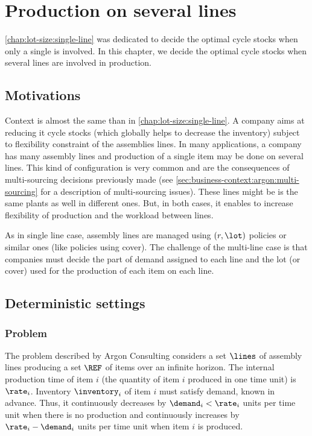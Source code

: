 \chapter{Production on several lines}
\label{chap:lot-size:several-lines}



\cref{chap:lot-size:single-line} was dedicated to decide the optimal cycle stocks when only a single is involved.
In this chapter, we decide the optimal cycle stocks when several lines are involved in production.



\section{Motivations}
\label{sec:lot-size:several-lines:motivations}


Context is almost the same than in \cref{chap:lot-size:single-line}.
A company aims at reducing it cycle stocks (which globally helps to decrease the inventory) subject to flexibility constraint of the assemblies lines.
In many applications, a company has many assembly lines and production of a single item may be done on several lines.
This kind of configuration is very common and are the consequences of multi-sourcing decisions previously made (see \cref{sec:business-context:argon:multi-sourcing} for a description of multi-sourcing issues).
These lines might be is the same plants as well in different ones.
But, in both cases, it enables to increase flexibility of production and the workload between lines.


As in single line case, assembly lines are managed using $(r,\lot)$ policies or similar ones (like policies using cover).
The challenge of the multi-line case is that companies must decide the part of demand assigned to each line and the lot (or cover) used for the production of each item on each line.


\section{Deterministic settings}


\subsection{Problem}


The problem described by Argon Consulting considers a set $\lines$ of assembly lines producing a set $\REF$ of items over an infinite horizon.
The internal production time of item $i$ (\ie the quantity of item $i$ produced in one time unit) is $\rate_i$.
Inventory $\inventory_i$ of item $i$ must satisfy demand, known in advance.
Thus, it continuously decreases by $\demand_i<\rate_i$ units per time unit when there is no production and continuously increases by $\rate_i-\demand_i$ units per time unit when item $i$ is produced.




